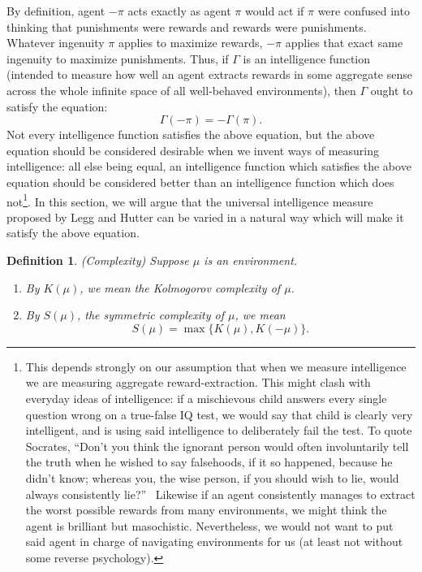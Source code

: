 \documentclass{article}
\newtheorem{definition}[theorem]{Definition}
\begin{document}
By definition, agent $-\pi$ acts exactly as agent $\pi$ would
act if $\pi$ were confused into thinking that punishments were rewards
and rewards were punishments.
Whatever ingenuity $\pi$ applies to maximize rewards,
$-\pi$ applies that exact same ingenuity to maximize punishments.
Thus, if $\Gamma$ is an intelligence function (intended to measure how
well an agent extracts rewards in some aggregate sense across the whole
infinite space of all well-behaved environments), then $\Gamma$ ought
to satisfy the equation:
\[
    \Gamma(-\pi) = -\Gamma(\pi).
\]
Not every intelligence function satisfies the above equation, but the
above equation should be considered desirable when we
invent ways of measuring intelligence: all else being equal, an
intelligence function which satisfies the above equation should be
considered better than an intelligence function which does
not\footnote{This depends strongly on our assumption that when we
measure intelligence we are measuring aggregate reward-extraction. This might clash
with everyday ideas of intelligence: if a mischievous child answers every single
question wrong on a true-false IQ test, we would say that child is clearly very
intelligent, and is using said intelligence to deliberately fail the test.
To quote Socrates, ``Don't you think the ignorant person would often involuntarily
tell the truth when he wished to say falsehoods, if it so happened, because he
didn't know; whereas you, the wise person, if you should wish to lie,
would always consistently lie?''\ \cite{lesserhippias}
Likewise if an agent consistently manages to extract the worst possible rewards
from many environments, we might think the agent is brilliant but
masochistic.
Nevertheless, we would not want to put said agent
in charge of navigating environments for us (at least not without some
reverse psychology).}.
In this section, we will argue that the universal intelligence measure
proposed by Legg and Hutter can be varied in a natural way which
will make it satisfy the above equation.

\begin{definition}
\label{complexitydefn}
(Complexity)
    Suppose $\mu$ is an environment.
    \begin{enumerate}
        \item By $K(\mu)$, we mean the Kolmogorov complexity of $\mu$.
        \item By $S(\mu)$, the \emph{symmetric complexity} of $\mu$,
        we mean
        \[
            S(\mu) = \max\{K(\mu), K(-\mu)\}.
        \]
    \end{enumerate}
\end{definition}
\end{document}
